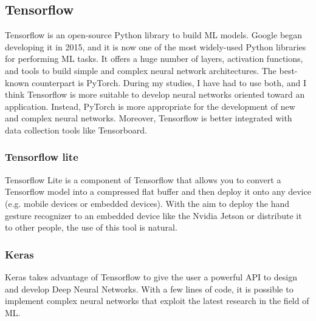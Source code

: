 \documentclass[../thesis.tex]{subfiles}
\begin{document}
\subsection{Tensorflow}
Tensorflow is an open-source Python library to build \acrshort{ML} models. Google began developing it in 2015, and it is now one of the most widely-used Python libraries for performing \acrshort{ML} tasks. It offers a huge number of layers, activation functions, and tools to build simple and complex neural network architectures. The best-known counterpart is PyTorch. During my studies, I have had to use both, and I think Tensorflow is more suitable to develop neural networks oriented toward an application. Instead, PyTorch is more appropriate for the development of new and complex neural networks. Moreover, Tensorflow is better integrated with data collection tools like Tensorboard. 

\subsubsection{Tensorflow lite}
Tensorflow Lite is a component of Tensorflow that allows you to convert a Tensorflow model into a compressed flat buffer and then deploy it onto any device (e.g. mobile devices or embedded devices). With the aim to deploy the hand gesture recognizer to an embedded device like the Nvidia Jetson or distribute it to other people, the use of this tool is natural.

\subsubsection{Keras}
Keras takes advantage of Tensorflow to give the user a powerful API to design and develop Deep Neural Networks. With a few lines of code, it is possible to implement complex neural networks that exploit the latest research in the field of  \gls{ML}.
\end{document}
